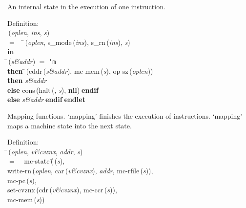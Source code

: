  An internal state in the execution of one instruction.
\begin{tabbing}{\sc Definition}: \\  
\=\,({\it{oplen\/}}, {\it{ins\/}}, {\it{s\/}}) \\ 
$=$$\;\;\;\;$\=\=\,({\it{oplen\/}}, {\rm{s\_mode}}\,({\it{ins\/}}), {\rm{s\_rn}}\,({\it{ins\/}}), {\it{s\/}})\- \\ 
{\bf in} \\ 
\=\,({\it{s\&addr\/}}) $=$ {\tt{'}}{\tt{m}} \\ 
{\bf then }\=\,({\rm{cddr}}\,({\it{s\&addr\/}}), {\rm{mc-mem}}\,({\it{s\/}}), {\rm{op-sz}}\,({\it{oplen\/}})) \\ 
{\bf then }{\it{s\&addr\/}} \\ 
{\bf else }{\rm{cons}}\,({\rm{halt}}\,({}, {\it{s\/}}), {\bf{nil}})$\;${\bf  endif}\- \\ 
{\bf else }{\it{s\&addr\/}}$\;${\bf  endif}\-$\;${\bf  endlet}\-\-
\end{tabbing}

 Mapping functions.  `mapping' finishes the execution of instructions.
 `mapping' maps a machine state into the next state.
\begin{tabbing}{\sc Definition}: \\  
\=\,({\it{oplen\/}}, {\it{v\&cvznx\/}}, {\it{addr\/}}, {\it{s\/}}) \\ 
$=$$\;\;\;\;${\rm{mc-state}}\,(\=\,({\it{s\/}}), \\ 
{\rm{write-rn}}\,({\it{oplen\/}}, {\rm{car}}\,({\it{v\&cvznx\/}}), {\it{addr\/}}, {\rm{mc-rfile}}\,({\it{s\/}})), \\ 
{\rm{mc-pc}}\,({\it{s\/}}), \\ 
{\rm{set-cvznx}}\,({\rm{cdr}}\,({\it{v\&cvznx\/}}), {\rm{mc-ccr}}\,({\it{s\/}})), \\ 
{\rm{mc-mem}}\,({\it{s\/}}))\-\-
\end{tabbing}

